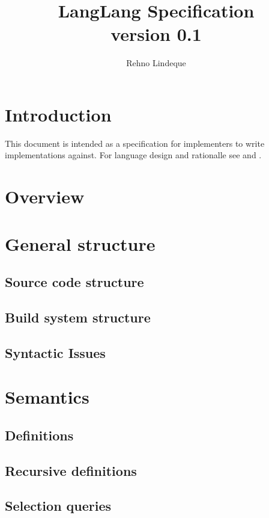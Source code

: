 \documentclass[11pt]{article}
\begin{document}
\title{LangLang Specification\\\small{version 0.1}}
\author{Rehno Lindeque}

\maketitle

\tableofcontents

\section{Introduction}
This document is intended as a specification for implementers to write implementations against. For language design and rationalle see \cite{ctxfoundation} and \cite{ctxrationalle}.

\section{Overview}

\section{General structure}
\subsection{Source code structure}

\subsection{Build system structure}

\subsection{Syntactic Issues}

\section{Semantics}
\subsection{Definitions}

\subsection{Recursive definitions}

\subsection{Selection queries}
\end{document}
